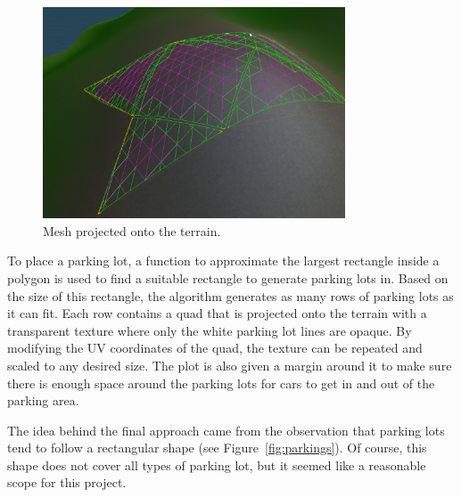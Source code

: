 \begin{figure}[H]
  \centering

  \includegraphics[width=0.8\textwidth]{figure/terrain_projector.png}
  \caption{Mesh projected onto the terrain.}

  \label{fig:methods_parking_terrain_projector}
\end{figure}

To place a parking lot, a function to approximate the largest rectangle inside a polygon is used to find a suitable rectangle to generate parking lots in.
Based on the size of this rectangle, the algorithm generates as many rows of parking lots as it can fit.
Each row contains a quad that is projected onto the terrain with a transparent texture where only the white parking lot lines are opaque.
By modifying the UV coordinates of the quad, the texture can be repeated and scaled to any desired size. 
The plot is also given a margin around it to make sure there is enough space around the parking lots for cars to get in and out of the parking area.

The idea behind the final approach came from the observation that parking lots tend to follow a rectangular shape (see Figure~\ref{fig:parkings}).
Of course, this shape does not cover all types of parking lot, but it seemed like a reasonable scope for this project.

